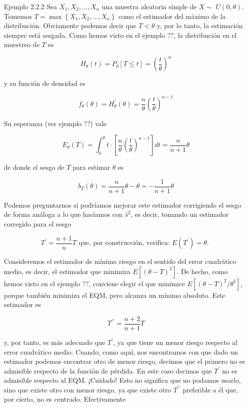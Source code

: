 \documentclass[
]{article}
\begin{document}
Ejemplo 2.2.2 Sea \(X_{1}, X_{2}, \ldots, X_{n}\) una muestra aleatoria simple de \(X \sim\) \(U(0, \theta)\). Tomemos \(T=\max \left\{X_{1}, X_{2}, \ldots, X_{n}\right\}\) como el estimador del máximo de la distribución. Obviamente podemos decir que \(T<\theta\) y, por lo tanto,
la estimación siempre está sesgada. Como hemos visto en el ejemplo ??, la distribución en el muestreo de \(T\) es

\[
H_{\theta}(t)=P_{\theta}[T \leq t]=\left(\frac{t}{\theta}\right)^{n}
\]

y su función de densidad es

\[
f_{\theta}(\theta)=H_{\theta}^{\prime}(\theta)=\frac{n}{\theta}\left(\frac{t}{\theta}\right)^{n-1}
\]

Su esperanza (ver ejemplo ??) vale

\[
E_{\theta}(T)=\int_{0}^{\theta} t \cdot\left[\frac{n}{\theta}\left(\frac{t}{\theta}\right)^{n-1}\right] d t=\frac{n}{n+1} \theta
\]

de donde el sesgo de \(T\) para estimar \(\theta\) es

\[
b_{T}(\theta)=\frac{n}{n+1} \theta-\theta=-\frac{1}{n+1} \theta
\]

Podemos preguntarnos si podríamos mejorar este estimador corrigiendo el sesgo de forma análoga a lo que hacíamos con \(\hat{s}^{2}\), es decir, tomando un estimador corregido para el sesgo

\[
T^{\prime}=\frac{n+1}{n} T \text { que, por construcción, verifica: } E\left(T^{\prime}\right)=\theta \text {. }
\]

Consideremos el estimador de mínimo riesgo en el sentido del error cuadrático medio, es decir, el estimador que minimiza \(E\left[(\theta-T)^{2}\right]\). De hecho, como hemos visto en el ejemplo ??, conviene elegir el que minimice \(E\left[(\theta-T)^{2} / \theta^{2}\right]\), porque también minimiza el EQM, pero alcanza un mínimo absoluto. Este estimador es

\[
T^{\prime \prime}=\frac{n+2}{n+1} T
\]

y, por tanto, es más adecuado que \(T^{\prime}\), ya que tiene un menor riesgo respecto al error cuadrático medio.
Cuando, como aquí, nos encontramos con que dado un estimador podemos encontrar otro de menor riesgo, decimos que el primero no es admisible respecto de la función de pérdida. En este caso decimos que \(T^{\prime}\) no es admisible respecto al EQM. ¡Cuidado! Esto no significa que no podamos usarlo, sino que existe otro con menor riesgo, ya que existe otro \(T^{\prime \prime}\) preferible a él que, por cierto, no es centrado. Efectivamente
\end{document}
